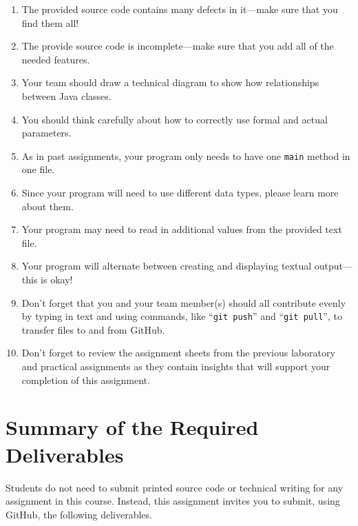 \documentclass[11pt]{article}
\newcommand{\command}[1]{``\lstinline{#1}''}
\begin{document}
\begin{enumerate}
  \setlength{\itemsep}{0pt}

\item The provided source code contains many defects in it---make sure that you find them all!

\item The provide source code is incomplete---make sure that you add all of the needed features.

\item Your team should draw a technical diagram to show how relationships between Java classes.

\item You should think carefully about how to correctly use formal and actual parameters.

\item As in past assignments, your program only needs to have one {\tt main} method in one file.

\item Since your program will need to use different data types, please learn more about them.

\item Your program may need to read in additional values from the provided text file.

\item Your program will alternate between creating and displaying textual output---this is okay!

\item Don't forget that you and your team member(s) should all contribute evenly by typing in text and using commands,
  like \command{git push} and \command{git pull}, to transfer files to and from GitHub.

\item Don't forget to review the assignment sheets from the previous laboratory and practical assignments as they
  contain insights that will support your completion of this assignment.

\end{enumerate}

\section*{Summary of the Required Deliverables}

\noindent Students do not need to submit printed source code or technical writing for any assignment in this course.
Instead, this assignment invites you to submit, using GitHub, the following deliverables.
\end{document}
